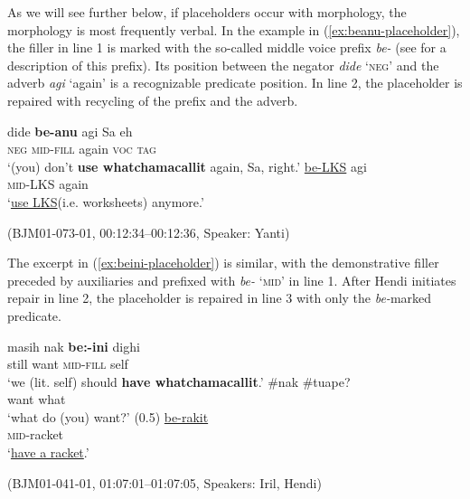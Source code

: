 \documentclass[output=paper,
\ChapterDOI{10.5281/zenodo.15697583}
colorlinks,
citecolor=brown]{langscibook}
\begin{document}
As we will see further below, if placeholders occur with morphology, the morphology is most frequently verbal. In the example in (\ref{ex:beanu-placeholder}), the filler in line 1 is marked with the so-called middle voice prefix \textit{be-} (see  for a description of this prefix). Its position between the negator \textit{dide} `\textsc{neg}' and the adverb \textit{agi} `again' is a recognizable predicate position. In line 2, the placeholder is repaired with recycling of the prefix and the adverb.

\begin{exe}
    \ex\label{ex:beanu-placeholder} 
    \begin{xlist}[0\quad →A:]
        \gll dide \textbf{be-anu} agi Sa eh\\
        \textsc{neg} \textsc{mid-fill} again \textsc{voc} \textsc{tag}\\
        \trans `(you) don't \textbf{use whatchamacallit} again, Sa, right.'
        \exi{2\quad \hphantom{→Y:}}
        \gll  \uline{be-LKS} agi\\
         \textsc{mid}-LKS again \\
        \trans `\uline{use LKS}\footnotemark (i.e. worksheets) anymore.'
    \end{xlist}
    \hfill (BJM01-073-01, 00:12:34--00:12:36, Speaker: Yanti)
\end{exe}


The excerpt in (\ref{ex:beini-placeholder}) is similar, with the demonstrative filler preceded by auxiliaries and prefixed with \textit{be-} `\textsc{mid}' in line 1. After Hendi initiates repair in line 2, the placeholder is repaired in line 3 with only the \textit{be-}marked predicate.

\begin{exe}
    \ex\label{ex:beini-placeholder}
    \begin{xlist}[0\quad →A:]
        \gll masih nak \textbf{be:-ini} dighi\\
        still want \textsc{mid-fill} self\\
        \trans `we (lit. self) should \textbf{have whatchamacallit}.'
         \#nak \#tuape?\footnotemark\\
        {} want what\\
        \trans `what do (you) want?'
        \exi{} (0.5)
        \gll  \uline{be-rakit}\\
         \textsc{mid}-racket \\
        \trans `\uline{have a racket}.'
    \end{xlist}
    \hfill (BJM01-041-01, 01:07:01--01:07:05, Speakers: Iril, Hendi)
\end{exe}
\end{document}
